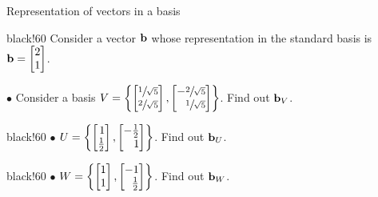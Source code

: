 \documentclass[aspectratio=169]{beamer}
\def\mf{\ensuremath\mathbf}
\def\lc{\ensuremath\left\{}
\def\rc{\ensuremath\right\}}
\newcommand{\demoex}[2]{\onslide<#1->\begin{color}{black!60} #2 \end{color}}
\begin{document}
\begin{frame}[t]{Representation of vectors in a basis}
\demoex{1}{
  Consider a vector $\mf{b}$ whose representation in the standard basis is $\mf{b} = \begin{bmatrix*}2\\1\end{bmatrix*}$.

  $\bullet$ Consider a basis $V = \lc \begin{bmatrix*}[r]\sfrac{1}{\sqrt{5}}\\\sfrac{2}{\sqrt{5}}\end{bmatrix*}, \begin{bmatrix*}[r]-\sfrac{2}{\sqrt{5}}\\\sfrac{1}{\sqrt{5}}\end{bmatrix*} \rc$. Find out $\mf{b}_V$.
}\vspace{0.2cm}

\demoex{2}{
  $\bullet$ $ U = \lc \begin{bmatrix*}[r]1\\\frac{1}{2}\end{bmatrix*}, \begin{bmatrix*}[r]-\frac{1}{2}\\1\end{bmatrix*} \rc$. Find out $\mf{b}_U$.
}\vspace{0.2cm}

\demoex{3}{
  $\bullet$ $W = \lc \begin{bmatrix*}[r]1\\1\end{bmatrix*}, \begin{bmatrix*}[r]-1\\\frac{1}{2}\end{bmatrix*} \rc$. Find out $\mf{b}_W$.
}
\end{frame}
\end{document}
